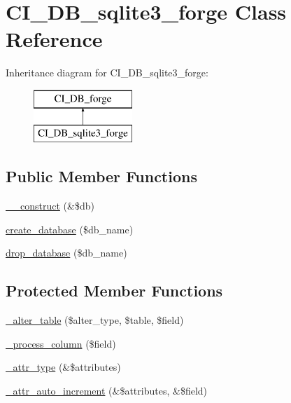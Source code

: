 \hypertarget{class_c_i___d_b__sqlite3__forge}{}\section{C\+I\+\_\+\+D\+B\+\_\+sqlite3\+\_\+forge Class Reference}
\label{class_c_i___d_b__sqlite3__forge}
Inheritance diagram for C\+I\+\_\+\+D\+B\+\_\+sqlite3\+\_\+forge\+:\begin{figure}[H]
\begin{center}
\leavevmode
\includegraphics[height=2.000000cm]{class_c_i___d_b__sqlite3__forge}
\end{center}
\end{figure}
\subsection*{Public Member Functions}
\begin{DoxyCompactItemize}
\item 
\mbox{\hyperlink{class_c_i___d_b__sqlite3__forge_aaf2ef772755ec6f361d44e16cc9ffd69}{\+\_\+\+\_\+construct}} (\&\$db)
\item 
\mbox{\hyperlink{class_c_i___d_b__sqlite3__forge_a902a7267babceb2ce595706f217e00ad}{create\+\_\+database}} (\$db\+\_\+name)
\item 
\mbox{\hyperlink{class_c_i___d_b__sqlite3__forge_a9612987b2d4230de2638d15857e92e67}{drop\+\_\+database}} (\$db\+\_\+name)
\end{DoxyCompactItemize}
\subsection*{Protected Member Functions}
\begin{DoxyCompactItemize}
\item 
\mbox{\hyperlink{class_c_i___d_b__sqlite3__forge_a41c6cae02f2fda8b429ad0afb9509426}{\+\_\+alter\+\_\+table}} (\$alter\+\_\+type, \$table, \$field)
\item 
\mbox{\hyperlink{class_c_i___d_b__sqlite3__forge_a8f38f1c5b5dddecca4befbe393f3f299}{\+\_\+process\+\_\+column}} (\$field)
\item 
\mbox{\hyperlink{class_c_i___d_b__sqlite3__forge_a8553be952084c6f7cdfff370a1d14f6b}{\+\_\+attr\+\_\+type}} (\&\$attributes)
\item 
\mbox{\hyperlink{class_c_i___d_b__sqlite3__forge_a2a013a5932439c3c44f0dad3436525f7}{\+\_\+attr\+\_\+auto\+\_\+increment}} (\&\$attributes, \&\$field)
\end{DoxyCompactItemize}
